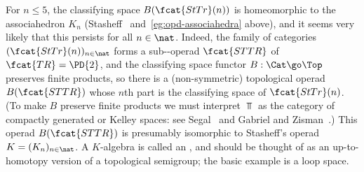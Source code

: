 For $n\leq 5$, the classifying space $B(\fcat{StTr}(n))$ is homeomorphic to
the associahedron%
%
%
$K_n$ (Stasheff~\cite{StaHAHI}%
%
%
and~\ref{eg:opd-associahedra} above), and it seems very likely that this
persists for all $n\in\nat$.  Indeed, the family of categories
$(\fcat{StTr}(n))_{n\in\nat}$ forms a sub-\Cat-operad $\fcat{STTR}$ of
$\fcat{TR} = \PD{2}$,%
% 
%
%
% 
and the classifying%
%
%
space functor $B: \Cat \go
\Top$ preserves finite products, so there is a (non-symmetric) topological
operad $B(\fcat{STTR})$ whose $n$th part is the classifying space of
$\fcat{StTr}(n)$.  (To make $B$ preserve finite products we must interpret
$\Top$ as the category of compactly generated or Kelley spaces: see
Segal~\cite[\S 1]{SegCSS} and Gabriel and Zisman~\cite[III.2]{GZ}.)  This
operad $B(\fcat{STTR})$ is presumably isomorphic to Stasheff's operad $K =
(K_n)_{n\in\nat}$.  A $K$-algebra is called an ,%
%
%
and should be thought of as an up-to-homotopy version of a topological
semigroup; the basic example is a loop space.

